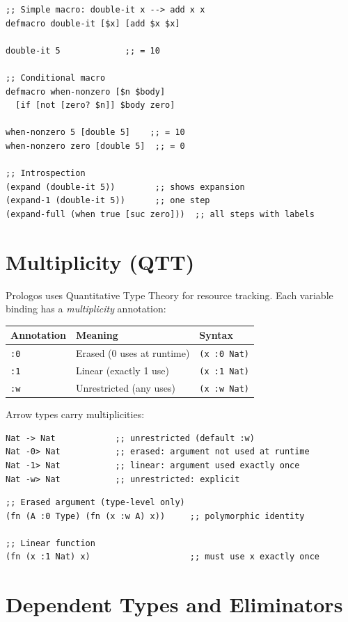 \documentclass[11pt]{article}
\begin{document}
\begin{verbatim}
;; Simple macro: double-it x --> add x x
defmacro double-it [$x] [add $x $x]

double-it 5             ;; = 10

;; Conditional macro
defmacro when-nonzero [$n $body]
  [if [not [zero? $n]] $body zero]

when-nonzero 5 [double 5]    ;; = 10
when-nonzero zero [double 5]  ;; = 0

;; Introspection
(expand (double-it 5))        ;; shows expansion
(expand-1 (double-it 5))      ;; one step
(expand-full (when true [suc zero]))  ;; all steps with labels
\end{verbatim}
\section{Multiplicity (QTT)}
\label{sec:org2147f01}

Prologos uses Quantitative Type Theory for resource tracking. Each variable
binding has a \emph{multiplicity} annotation:

\begin{center}
\begin{tabular}{lll}
Annotation & Meaning & Syntax\\
\hline
\texttt{:0} & Erased (0 uses at runtime) & \texttt{(x :0 Nat)}\\
\texttt{:1} & Linear (exactly 1 use) & \texttt{(x :1 Nat)}\\
\texttt{:w} & Unrestricted (any uses) & \texttt{(x :w Nat)}\\
\end{tabular}
\end{center}

Arrow types carry multiplicities:

\begin{verbatim}
Nat -> Nat            ;; unrestricted (default :w)
Nat -0> Nat           ;; erased: argument not used at runtime
Nat -1> Nat           ;; linear: argument used exactly once
Nat -w> Nat           ;; unrestricted: explicit
\end{verbatim}

\begin{verbatim}
;; Erased argument (type-level only)
(fn (A :0 Type) (fn (x :w A) x))     ;; polymorphic identity

;; Linear function
(fn (x :1 Nat) x)                    ;; must use x exactly once
\end{verbatim}
\section{Dependent Types and Eliminators}
\label{sec:org3677728}
\end{document}
